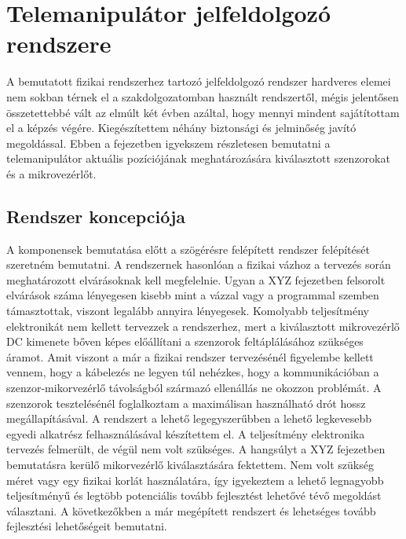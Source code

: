 \chapter{Telemanipulátor jelfeldolgozó rendszere}
\label{sec:LatexTools}

A bemutatott fizikai rendszerhez tartozó jelfeldolgozó rendszer hardveres elemei nem sokban térnek el a szakdolgozatomban használt rendszertől, mégis jelentősen összetettebbé vált az elmúlt két évben azáltal, hogy mennyi mindent sajátítottam el a képzés végére. Kiegészítettem néhány biztonsági és jelminőség javító megoldással. Ebben a fejezetben igyekszem részletesen bemutatni a telemanipulátor aktuális pozíciójának meghatározására kiválasztott szenzorokat és a mikrovezérlőt.

\section{Rendszer koncepciója}

A komponensek bemutatása előtt a szögérésre felépített rendszer felépítését szeretném bemutatni. A rendszernek hasonlóan a fizikai vázhoz a tervezés során meghatározott elvárásoknak kell megfelelnie. Ugyan a XYZ fejezetben felsorolt elvárások száma lényegesen kisebb mint a vázzal vagy a programmal szemben támasztottak, viszont legalább annyira lényegesek. Komolyabb teljesítmény elektronikát nem kellett tervezzek a rendszerhez, mert a kiválasztott mikrovezérlő DC kimenete bőven képes előállítani a szenzorok feltáplálásához szükséges áramot. Amit viszont a már a fizikai rendszer tervezésénél figyelembe kellett vennem, hogy a kábelezés ne legyen túl nehézkes, hogy a kommunikációban a szenzor-mikorvezérlő távolságból származó ellenállás ne okozzon problémát. A szenzorok tesztelésénél foglalkoztam a maximálisan használható drót hossz megállapításával. A rendszert a lehető legegyszerűbben a lehető legkevesebb egyedi alkatrész felhasználásával készítettem el. A teljesítmény elektronika tervezés felmerült, de végül nem volt szükséges. A hangsúlyt a XYZ fejezetben bemutatásra kerülő mikorvezérlő kiválasztására fektettem. Nem volt szükség méret vagy egy fizikai korlát használatára, így igyekeztem a lehető legnagyobb teljesítményű és legtöbb potenciális tovább fejlesztést lehetővé tévő megoldást választani. A következőkben a már megépített rendszert és lehetséges tovább fejlesztési lehetőségeit bemutatni.

